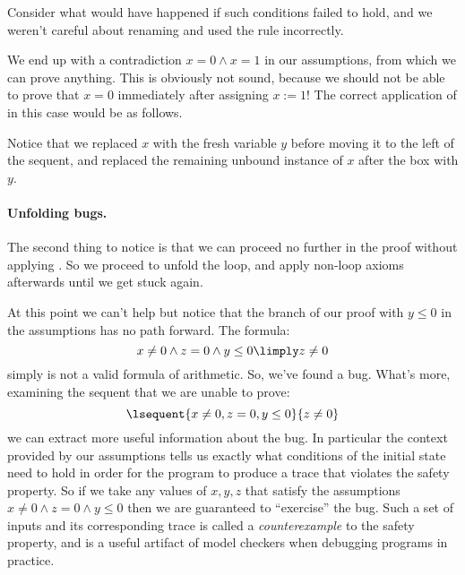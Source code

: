 \documentclass[11pt,twoside]{scrartcl}
\begin{document}
Consider what would have happened if such conditions failed to hold, and we weren't careful about renaming and used the rule incorrectly.
\begin{sequentdeduction}
 {
}
\end{sequentdeduction}
We end up with a contradiction $x=0\land x=1$ in our assumptions, from which we can prove anything. This is obviously not sound, because we should not be able to prove that $x=0$ immediately after assigning $x:=1$! The correct application of  in this case would be as follows.
\begin{sequentdeduction}
 {
}
\end{sequentdeduction}
Notice that we replaced $x$ with the fresh variable $y$ before moving it to the left of the sequent, and replaced the remaining unbound instance of $x$ after the box with $y$.

\paragraph{Unfolding bugs.}
The second thing to notice is that we can proceed no further in the proof without applying . So we proceed to unfold the loop, and apply non-loop axioms afterwards until we get stuck again.
\begin{sequentdeduction}
 {
}
\end{sequentdeduction}
At this point we can't help but notice that the branch of our proof with $y\le0$ in the assumptions has no path forward. The formula:
\begin{equation}
\label{eq:vcbug}
x \ne 0 \land z = 0 \land y \le 0 \limply z \ne 0
\end{equation}
simply is not a valid formula of arithmetic. So, we've found a bug. What's more, examining the sequent that we are unable to prove:
\begin{equation}
\lsequent{x\ne0,z=0,y\le0}{z\ne0}
\end{equation}
we can extract more useful information about the bug. In particular the context provided by our assumptions tells us exactly what conditions of the initial state need to hold in order for the program to produce a trace that violates the safety property. So if we take any values of $x,y,z$ that satisfy the assumptions $x\ne0 \land z=0 \land y\le0$ then we are guaranteed to ``exercise'' the bug. Such a set of inputs and its corresponding trace is called a \emph{counterexample} to the safety property, and is a useful artifact of model checkers when debugging programs in practice.
\end{document}
